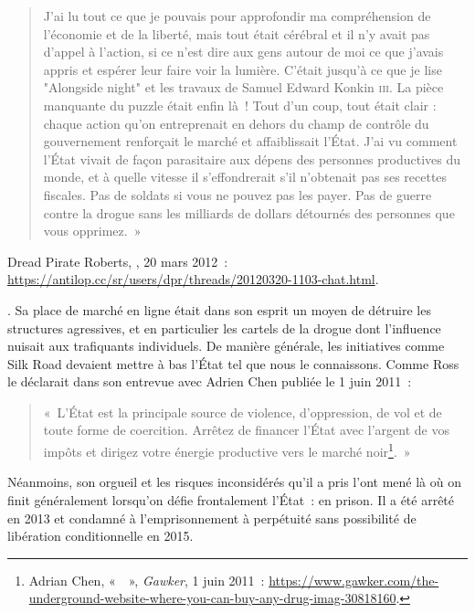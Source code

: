 {\begin{quote}
J'ai lu tout ce que je pouvais pour approfondir ma compréhension de l'économie et de la liberté, mais tout était cérébral et il n'y avait pas d'appel à l'action, si ce n'est dire aux gens autour de moi ce que j'avais appris et espérer leur faire voir la lumière. C'était jusqu'à ce que je lise "Alongside night" et les travaux de Samuel Edward Konkin \textsc{iii}. La pièce manquante du puzzle était enfin là~! Tout d'un coup, tout était clair : chaque action qu'on entreprenait en dehors du champ de contrôle du gouvernement renforçait le marché et affaiblissait l'État. J'ai vu comment l'État vivait de façon parasitaire aux dépens des personnes productives du monde, et à quelle vitesse il s'effondrerait s'il n'obtenait pas ses recettes fiscales. Pas de soldats si vous ne pouvez pas les payer. Pas de guerre contre la drogue sans les milliards de dollars détournés des personnes que vous opprimez.~»
\end{quote}
Dread Pirate Roberts, , 20 mars 2012~: \url{https://antilop.cc/sr/users/dpr/threads/20120320-1103-chat.html}.}. Sa place de marché en ligne était dans son esprit un moyen de détruire les structures agressives, et en particulier les cartels de la drogue dont l'influence nuisait aux trafiquants individuels. De manière générale, les initiatives comme Silk Road devaient mettre à bas l'État tel que nous le connaissons. Comme Ross le déclarait dans son entrevue avec Adrien Chen publiée le 1\ier{} juin 2011~:

\begin{quote}
«~L'État est la principale source de violence, d'oppression, de vol et de toute forme de coercition. Arrêtez de financer l'État avec l'argent de vos impôts et dirigez votre énergie productive vers le marché noir\footnote{Adrian Chen, «~~», \emph{Gawker}, 1\ier{} juin 2011~: \url{https://www.gawker.com/the-underground-website-where-you-can-buy-any-drug-imag-30818160}.}.~»
\end{quote}

Néanmoins, son orgueil et les risques inconsidérés qu'il a pris l'ont mené là où on finit généralement lorsqu'on défie frontalement l'État~: en prison. Il a été arrêté en 2013 et condamné à l'emprisonnement à perpétuité sans possibilité de libération conditionnelle en 2015.

